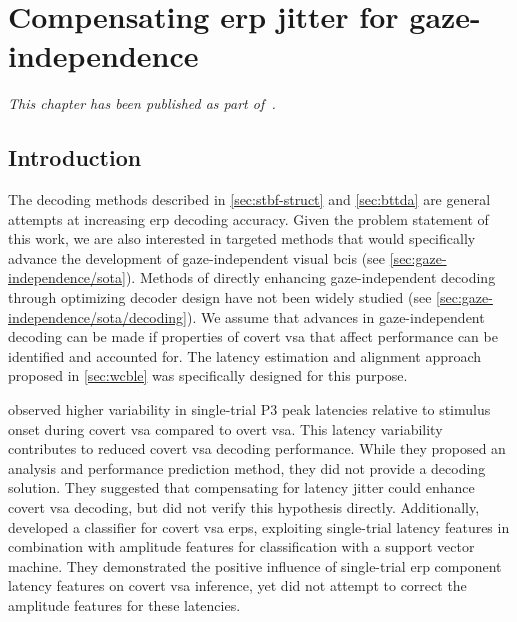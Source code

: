 \chapter{Compensating \acs{erp} jitter for gaze-independence}
\label{sec:covert-align}
\emph{This chapter has been published as part of~\textcite{VanDenKerchove2024}.}

\section{Introduction}

The decoding methods described in \cref{sec:stbf-struct} and
\cref{sec:bttda} are general attempts at increasing \ac{erp} decoding accuracy.
Given the problem statement of this work, we are also interested in targeted
methods that would specifically advance the development of gaze-independent
visual \acp{bci} (see \cref{sec:gaze-independence/sota}).
Methods of directly enhancing gaze-independent decoding through optimizing
decoder design have not been widely studied (see
\cref{sec:gaze-independence/sota/decoding}).
We assume that advances in gaze-independent decoding can be made if properties
of covert \ac{vsa} that affect performance can be identified and accounted for.
The latency estimation and alignment approach proposed in \cref{sec:wcble}
was specifically designed for this purpose.

\textcite{Arico2014} observed higher variability in single-trial P3 peak
latencies relative to stimulus onset during covert \ac{vsa} compared to overt
\ac{vsa}.
This latency variability contributes to reduced covert \ac{vsa} decoding performance.
While they proposed an analysis and performance prediction method, they did not provide a
decoding solution.
They suggested that compensating for latency jitter could enhance covert \ac{vsa}
decoding, but did not verify this hypothesis directly.
Additionally, \cite{Hardiansyah2020} developed a classifier for
covert \ac{vsa} \acp{erp}, exploiting single-trial latency features in combination with
amplitude features for classification with a support vector machine.
They demonstrated the positive influence of single-trial \ac{erp} component latency
features on covert \ac{vsa} inference, yet did not attempt to correct the amplitude
features for these latencies.


